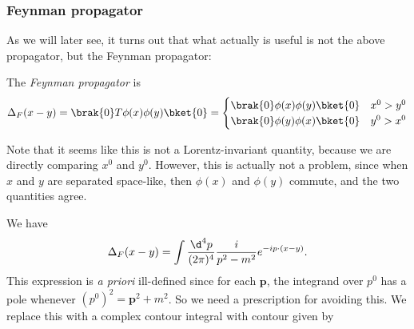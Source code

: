 \documentclass[a4paper]{article}
\begin{document}

\subsubsection*{Feynman propagator}
As we will later see, it turns out that what actually is useful is not the above propagator, but the Feynman propagator:
\begin{defi}
  The \emph{Feynman propagator} is
  \[
    \Delta_F (x - y) = \brak{0} T \phi(x) \phi(y) \bket{0} =
    \begin{cases}
      \brak{0} \phi(x) \phi(y) \bket{0} & x^0 > y^0\\
      \brak{0} \phi(y) \phi(x) \bket{0} & y^0 > x^0
    \end{cases}
  \]
\end{defi}
Note that it seems like this is not a Lorentz-invariant quantity, because we are directly comparing $x^0$ and $y^0$. However, this is actually not a problem, since when $x$ and $y$ are separated space-like, then $\phi(x)$ and $\phi(y)$ commute, and the two quantities agree.

\begin{prop}
  We have
  \[
    \Delta_F(x - y) = \int \frac{\d^4 p}{(2\pi)^4 } \frac{i}{p^2 - m^2} e^{-ip \cdot (x - y)}.
  \]
  This expression is \emph{a priori} ill-defined since for each $\mathbf{p}$, the integrand over $p^0$ has a pole whenever $(p^0)^2 = \mathbf{p}^2 + m^2$. So we need a prescription for avoiding this. We replace this with a complex contour integral with contour given by
  \begin{center}
  \end{center}
\end{prop}
\end{document}
